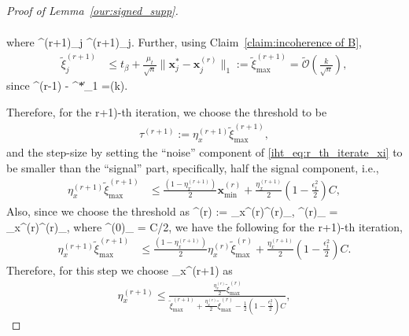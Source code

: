 \documentclass{article}
\def\[#1\]{{$#1$}}
\def\b#1{{\mathbf{#1}}}
\def\c#1{{\mathcal{#1}}}
\begin{document}
\begin{proof}[Proof of Lemma~\ref{our:signed_supp}]
\begin{align}
		\end{align}







		where \[\xi^{(r+1)}_{j} \leq \tilde{\xi}^{(r+1)}_{j}\]. Further, using Claim~\ref{claim:incoherence of B},
		\begin{align}\label{eq:xi_til_max}
		\tilde{\xi}^{(r+1)}_{j}  &\leq t_\beta + \tfrac{\mu_t}{\sqrt{n}} \|\b{x}^*_j - \b{x}^{(r)}_j\|_1 := \tilde{\xi}^{(r+1)}_{\max} = \tilde{\mathcal{O}}(\tfrac{k}{\sqrt{n}}),
		\end{align}
		since \[\|\b{x}^{(r-1)} - \b{x}^*\|_1 =\c{O}(k)\].
		
		Therefore, for the \[(r+1)\]-th iteration, we choose the threshold to be 
		\begin{align}\label{eq:threshold}
		\tau^{(r+1)} := \eta_x^{(r+1)}\tilde{\xi}^{(r+1)}_{\max},
		\end{align}
		and the step-size by setting the ``noise'' component of \eqref{iht_eq:r_th_iterate_xi} to be smaller than the ``signal'' part, specifically, half the signal component, i.e., 
		\begin{align*}
		\eta_x^{(r+1)}\tilde{\xi}^{(r+1)}_{\max}  
		&\leq \tfrac{(1 - \eta_{x}^{(r+1)})}{2}\b{x}^{(r)}_{\min} + \tfrac{\eta_{x}^{(r+1)}}{2}(1-\tfrac{\epsilon_t^2}{2})C,
		\end{align*}
		 Also, since we choose the threshold as \[ \tau^{(r)} := \eta_x^{(r)}\tilde{\xi}^{(r)}_{\max}\], \[\b{x}^{(r)}_{\min} = \eta_x^{(r)}\tilde{\xi}^{(r)}_{\max}\], where \[\b{x}^{(0)}_{\min} = C/2\], we have the following for the \[(r+1)\]-th iteration,
		\begin{align*}
		\eta_x^{(r+1)}\tilde{\xi}^{(r+1)}_{\max}  
		&\leq \tfrac{(1 - \eta_{x}^{(r+1)})}{2}\eta_x^{(r)}\tilde{\xi}^{(r)}_{\max} + \tfrac{\eta_{x}^{(r+1)}}{2}(1-\tfrac{\epsilon_t^2}{2})C.
		\end{align*}
		Therefore, for this step we choose \[\eta_x^{(r+1)}\] as
		\begin{align}
		\label{iht_eq:eta_x_r}
		\eta_x^{(r+1)} \leq  \tfrac{\tfrac{\eta_x^{(r)}}{2}\tilde{\xi}^{(r)}_{\max}}{\tilde{\xi}^{(r+1)}_{\max}+ \tfrac{\eta_x^{(r)}}{2}\tilde{\xi}^{(r)}_{\max} - \tfrac{1}{2}(1-\tfrac{\epsilon_t^2}{2})C},
		
		\end{align}
		
		
		
		
		
		
		

\end{proof}
\end{document}
